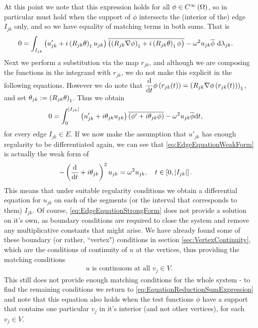 At this point we note that this expression holds for all $\phi\in C^{\infty}\left( \Omega \right)$, so in particular must hold when the support of $\phi$ intersects the (interior of the) edge $I_{jk}$ only, and so we have equality of matching terms in both sums.
That is
\begin{align*}
	0 &= \int_{I_{jk}}\left( u_{jk}' + i\left( R_{jk}\theta \right)_1 u_{jk} \right)\overline{\left( \left( R_{jk}\nabla\phi \right)_1 + i\left( R_{jk}\theta \right)_1 \phi \right)} - \omega^2 u_{jk}\overline{\phi} \ \mathrm{d}\lambda_{jk}.
\end{align*}
Next we perform a substitution via the map $r_{jk}$, and although we are composing the functions in the integrand with $r_{jk}$, we do not make this explicit in the following equations.
However we do note that $\dfrac{\mathrm{d}}{\mathrm{d}t}\phi\left( r_{jk}(t) \right) = \left( R_{jk}\nabla\phi\left( r_{jk}(t) \right) \right)_1$, and set $\theta_{jk} := \left( R_{jk}\theta \right)_1$.
Thus we obtain
\begin{align} \label{eq:EdgeEquationWeakForm}
	0 &= \int_0^{\left\lvert I_{jk} \right\rvert} \left(  u'_{jk} + i\theta_{jk}u_{jk}  \right) \overline{\left(  \phi' + i\theta_{jk}\phi  \right)} - \omega^2 u_{jk}\overline{\phi} \mathrm{d} t,
\end{align}
for every edge $I_{jk}\in E$. 
If we now make the assumption that $u'_{jk}$ has enough regularity to be differentiated again, we can see that \eqref{eq:EdgeEquationWeakForm} is actually the weak form of
\begin{align} \label{eq:EdgeEquationStrongForm}
	-\left( \dfrac{\mathrm{d}}{\mathrm{d}t} + i\theta_{jk} \right)^2 u_{jk} &= \omega^2 u_{jk}, \quad t\in\left[ 0,\left\lvert I_{jk} \right\rvert \right].
\end{align}
This means that under suitable regularity conditions we obtain a differential equation for $u_{jk}$ on each of the segments (or the interval that corresponds to them) $I_{jk}$.
Of course, \eqref{eq:EdgeEquationStrongForm} does not provide a solution on it's own, as boundary conditions are required to close the system and remove any multiplicative constants that might arise.
We have already found some of these boundary (or rather, ``vertex") conditions in section \ref{sec:VertexContinuity}, which are the conditions of continuity of $u$ at the vertices, thus providing the matching conditions
\begin{align} \label{eq:EdgeEquationsMatchingConditons}
	u \text{ is continuous at all } v_j\in V.
\end{align}
This still does not provide enough matching conditions for the whole system - to find the remaining conditions we return to \eqref{eq:EquationReductionSumExpression} and note that this equation also holds when the test functions $\phi$ have a support that contains one particular $v_j$ in it's interior (and not other vertices), for each $v_j\in V$.
